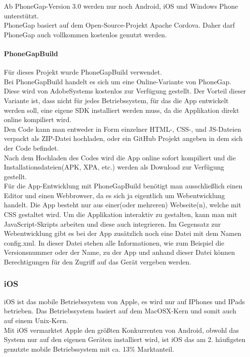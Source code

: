 Ab PhoneGap-Version 3.0 werden nur noch Android, iOS und Windows Phone unterstützt.\\

PhoneGap basiert auf dem Open-Source-Projekt Apache Cordova. Daher darf PhoneGap auch vollkommen kostenlos genutzt werden.\\
\paragraph{PhoneGapBuild\\}
Für dieses Projekt wurde PhoneGapBuild verwendet.\\
Bei PhoneGapBuild handelt es sich um eine Online-Variante von PhoneGap. Diese wird von AdobeSystems kostenlos zur Verfügung gestellt. Der Vorteil dieser Variante ist, dass nicht für jedes Betriebssystem, für das die App entwickelt werden soll, eine eigene SDK installiert werden muss, da die Applikation direkt online kompiliert wird.\\
Den Code kann man entweder in Form einzelner HTML-, CSS-, und JS-Dateien verpackt als ZIP-Datei hochladen, oder ein GitHub Projekt angeben in dem sich der Code befindet.\\
Nach dem Hochladen des Codes wird die App online sofort kompiliert und die Installationsdateien(APK, XPA, etc.) werden als Download zur Verfügung gestellt.\\

Für die App-Entwicklung mit PhoneGapBuild benötigt man ausschließlich einen Editor und einen Webbrowser, da es sich ja eigentlich um Webentwicklung handelt. Die App besteht nur aus einer(oder mehreren) Webseite(n), welche mit CSS gestaltet wird. Um die Applikation interaktiv zu gestalten, kann man mit JavaScript-Skripts arbeiten und diese auch integrieren. Im Gegensatz zur Webentwicklung gibt es bei der App zusätzlich noch eine Datei mit dem Namen config.xml. In dieser Datei stehen alle Informationen, wie zum Beispiel die Versionsnummer oder der Name, zu der App und anhand dieser Datei können Berechtigungen für den Zugriff auf das Gerät vergeben werden.\\

\subsubsection{iOS}
iOS ist das mobile Betriebssystem von Apple, es wird nur auf IPhones und IPads betrieben. Das Betriebssystem basiert auf dem MacOSX-Kern und somit auch auf einem Unix-Kern.\\
Mit iOS vermarktet Apple den größten Konkurrenten von Android, obwohl das System nur auf den eigenen Geräten installiert wird, ist iOS das am 2. häufigsten genutzte mobile Betriebssystem mit ca. 13\% Marktanteil.\\
